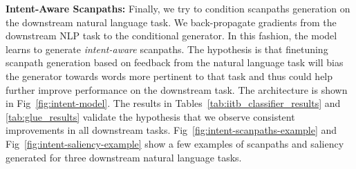  
\textbf{Intent-Aware Scanpaths:} \label{sec:intent-scanpaths} Finally, we try to condition scanpaths generation on the downstream natural language task. We back-propagate gradients from the downstream NLP task to the conditional generator. In this fashion, the model learns to generate \textit{intent-aware} scanpaths.
The hypothesis is that finetuning scanpath generation based on feedback from the natural language task will bias the generator towards words more pertinent to that task and thus could help further improve performance on the downstream task. The architecture is shown in Fig~\ref{fig:intent-model}. The results in Tables~\ref{tab:iitb_classifier_results} and \ref{tab:glue_results} validate the hypothesis that we observe consistent improvements in all downstream tasks. Fig~\ref{fig:intent-scanpaths-example} and Fig~\ref{fig:intent-saliency-example} show a few examples of scanpaths and saliency generated for three downstream natural language tasks. 

